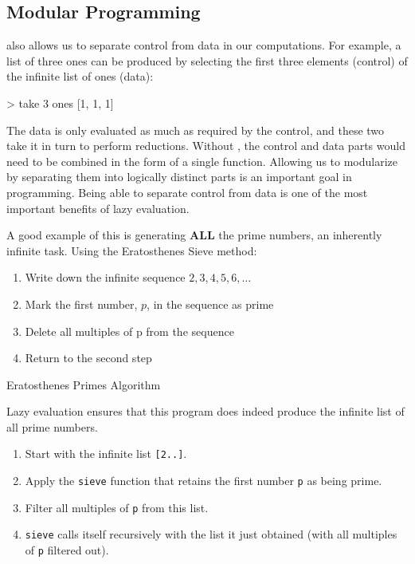 \subsection{Modular Programming}\label{subsec:Modular_Programming}
 also allows us to separate control from data in our computations.
For example, a list of three ones can be produced by selecting the first three elements (control) of the infinite list of ones (data):
\begin{haskellsource}
> take 3 ones
[1, 1, 1]
\end{haskellsource}

The data is only evaluated as much as required by the control, and these two take it in turn to perform reductions.
Without , the control and data parts would need to be combined in the form of a single function.
Allowing us to modularize by separating them into logically distinct parts is an important goal in programming.
Being able to separate control from data is one of the most important benefits of lazy evaluation.

A good example of this is generating \textbf{ALL} the prime numbers, an inherently infinite task.
Using the Eratosthenes Sieve method:
\begin{enumerate}[noitemsep]
\item Write down the infinite sequence $2, 3, 4, 5, 6, \ldots$
\item Mark the first number, $p$, in the sequence as prime
\item Delete all multiples of p from the sequence
\item Return to the second step
\end{enumerate}

\begin{listing}[h!tbp]
\caption{Eratosthenes Primes Algorithm}
\label{lst:Eratosthenes_Primes}
\end{listing}

Lazy evaluation ensures that this program does indeed produce the infinite list of all prime numbers.
\begin{enumerate}[noitemsep]
\item Start with the infinite list \texttt{[2..]}.
\item Apply the \texttt{sieve} function that retains the first number \texttt{p} as being prime.
\item Filter all multiples of \texttt{p} from this list.
\item \texttt{sieve} calls itself recursively with the list it just obtained (with all multiples of \texttt{p} filtered out).
\end{enumerate}



